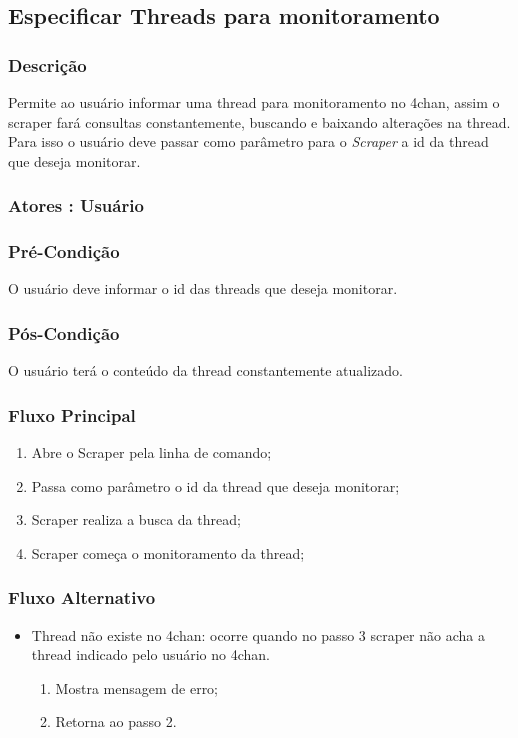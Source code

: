 \subsection{Especificar Threads para monitoramento}
\subsubsection{Descrição}
Permite ao usuário informar uma thread para monitoramento no 4chan, assim o scraper fará consultas constantemente, buscando e baixando alterações na thread. Para isso o usuário deve passar como parâmetro para o \textit{Scraper} a id da thread que deseja monitorar. 
\subsubsection{Atores : Usuário}
\subsubsection{Pré-Condição}
O usuário deve informar o id das threads que deseja monitorar.
\subsubsection{Pós-Condição}
O usuário terá o conteúdo da thread constantemente atualizado.
\subsubsection{Fluxo Principal}
\begin{enumerate}
    \item Abre o Scraper pela linha de comando;
    \item Passa como parâmetro o id da thread que deseja monitorar;
    \item Scraper realiza a busca da thread;
    \item Scraper começa o monitoramento da thread;
\end{enumerate}
\subsubsection{Fluxo Alternativo}
\begin{itemize}
    \item Thread não existe no 4chan: ocorre quando no passo 3 scraper não acha a thread indicado pelo usuário no 4chan.
    \begin{enumerate}
        \item Mostra mensagem de erro;
        \item Retorna ao passo 2.
    \end{enumerate}
\end{itemize}


